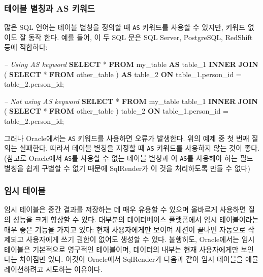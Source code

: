 \documentclass[11pt]{book}
\newenvironment{Shaded}{\begin{snugshade}}{\end{snugshade}}
\newcommand{\KeywordTok}[1]{\textcolor[rgb]{0.13,0.29,0.53}{\textbf{#1}}}
\newcommand{\DecValTok}[1]{\textcolor[rgb]{0.00,0.00,0.81}{#1}}
\newcommand{\CommentTok}[1]{\textcolor[rgb]{0.56,0.35,0.01}{\textit{#1}}}
\newcommand{\NormalTok}[1]{#1}
\theoremstyle{definition}
\theoremstyle{definition}
\theoremstyle{definition}
\theoremstyle{remark}
\begin{document}
\subsubsection*{테이블 별칭과 AS 키워드}\label{--as-}

많은 SQL 언어는 테이블 별칭을 정의할 때 \texttt{AS} 키워드를 사용할 수
있지만, 키워드 없이도 잘 동작 한다. 예를 들어, 이 두 SQL 문은 SQL
Server, PostgreSQL, RedShift 등에 적합하다:

\begin{Shaded}
\begin{Highlighting}[]
\CommentTok{-- Using AS keyword}
\KeywordTok{SELECT}\NormalTok{ * }
\KeywordTok{FROM}\NormalTok{ my_table }\KeywordTok{AS}\NormalTok{ table_}\DecValTok{1}
\KeywordTok{INNER} \KeywordTok{JOIN}\NormalTok{ (}
  \KeywordTok{SELECT}\NormalTok{ * }\KeywordTok{FROM}\NormalTok{ other_table}
\NormalTok{) }\KeywordTok{AS}\NormalTok{ table_}\DecValTok{2}
\KeywordTok{ON}\NormalTok{ table_1.person_id = table_2.person_id;}

\CommentTok{-- Not using AS keyword}
\KeywordTok{SELECT}\NormalTok{ * }
\KeywordTok{FROM}\NormalTok{ my_table table_}\DecValTok{1}
\KeywordTok{INNER} \KeywordTok{JOIN}\NormalTok{ (}
  \KeywordTok{SELECT}\NormalTok{ * }\KeywordTok{FROM}\NormalTok{ other_table}
\NormalTok{) table_}\DecValTok{2}
\KeywordTok{ON}\NormalTok{ table_1.person_id = table_2.person_id;}
\end{Highlighting}
\end{Shaded}

그러나 Oracle에서는 \texttt{AS} 키워드를 사용하면 오류가 발생한다. 위의
예제 중 첫 번째 질의는 실패한다. 따라서 테이블 별칭을 지정할 때
\texttt{AS} 키워드를 사용하지 않는 것이 좋다. (참고로 Oracle에서
\texttt{AS}를 사용할 수 없는 테이블 별칭과 이 \texttt{AS}를 사용해야
하는 필드 별칭을 쉽게 구별할 수 없기 때문에 SqlRender가 이 것을
처리하도록 만들 수 없다)

\subsubsection*{임시 테이블}\label{-}

임시 테이블은 중간 결과를 저장하는 데 매우 유용할 수 있으며 올바르게
사용하면 질의 성능을 크게 향상할 수 있다. 대부분의 데이터베이스
플랫폼에서 임시 테이블이라는 매우 좋은 기능을 가지고 있다: 현재
사용자에게만 보이며 세션이 끝나면 자동으로 삭제되고 사용자에게 쓰기
권한이 없어도 생성할 수 있다. 불행히도, Oracle에서는 임시테이블은
기본적으로 영구적인 테이블이며, 데이터의 내부는 현재 사용자에게만
보인다는 차이점만 있다. 이것이 Oracle에서 SqlRender가 다음과 같이 임시
테이블을 에뮬레이션하려고 시도하는 이유이다.
\end{document}
